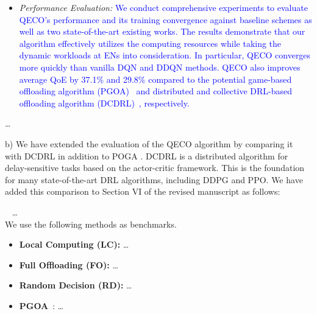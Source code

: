 \documentclass[12pt,draftclsnofoot,onecolumn]{IEEEtran}
\newcommand{\rev}[1]{{\color{blue}#1}} %
\newcommand{\rev}[1]{#1}
\newenvironment{my}[2]%
{\begin{list}{}%
{\setlength{\rightmargin}{#1}\setlength{\leftmargin}{#2}}%


 \item[]{}

} {\end{list}}
\begin{document}
\begin{enumerate}
\begin{my}{1cm}{1cm}
{\begin{itemize}
				\item \textit{Performance Evaluation:} \textcolor{blue}{We conduct comprehensive experiments to evaluate QECO’s performance and its training convergence against baseline schemes as well as two state-of-the-art existing works. The results demonstrate that our algorithm effectively utilizes the computing resources while taking the dynamic workloads at ENs into consideration. In particular, QECO converges more quickly than vanilla DQN and DDQN methods. QECO also improves average QoE by 37.1\% and 29.8\% compared to the potential game-based offloading algorithm (PGOA)~\cite{yang2018distributed} and distributed and collective DRL-based offloading algorithm (DCDRL)~\cite{qiu2020distributed}, respectively.}
				
				
			\end{itemize}
			
			\dots
	}

	
\end{my}\vspace{6mm}


b) We have extended the evaluation of the QECO algorithm by comparing it with DCDRL \cite{qiu2020distributed} in addition to POGA \cite{yang2018distributed}. DCDRL is a distributed algorithm for delay-sensitive tasks based on the actor-critic framework. This is the foundation for many state-of-the-art DRL algorithms, including DDPG and PPO. We have added this comparison to Section VI of the revised manuscript as follows: 
\begin{my}{1cm}{1cm}
	\rev{
		{\
			\color{black}
			\hspace{-10mm}  \dots \\ We use the following methods as benchmarks.
			\begin{itemize}
				
				\item \textbf{Local Computing (LC):} \dots\vspace{1mm}
				
				\item \textbf{Full Offloading (FO):} \dots\vspace{1mm}
				
				\item \textbf{Random Decision (RD):} \dots\vspace{1mm}
				
				\item \textbf{PGOA}~\cite{yang2018distributed}: \dots\vspace{1mm}
				

\end{itemize}}}
\end{my}
\end{enumerate}
\end{document}

